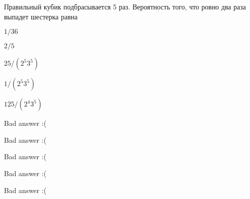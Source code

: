 
\begin{question}
Правильный кубик подбрасывается 5 раз. Вероятность того, что ровно два
раза выпадет шестерка равна
\begin{answerlist}
  \item \(1/36\)
  \item \(2/5\)
  \item \(25/(2^5 3^5)\)
  \item \(1/(2^5 3^5)\)
  \item \(125/(2^4 3^5)\)
\end{answerlist}
\end{question}

\begin{solution}
\begin{answerlist}
  \item Bad answer :(
  \item Bad answer :(
  \item Bad answer :(
  \item Bad answer :(
  \item Bad answer :(
\end{answerlist}
\end{solution}

